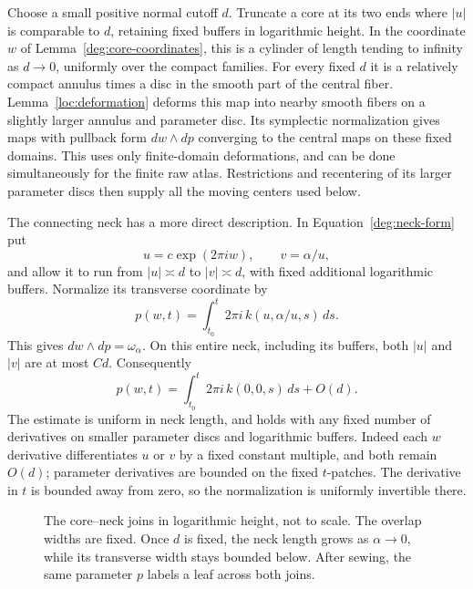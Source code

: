 Choose a small positive normal cutoff $d$.  Truncate a core at
its two ends where $|u|$ is comparable to $d$, retaining fixed
buffers in logarithmic height.  In the coordinate $w$ of
Lemma~\ref{deg:core-coordinates}, this is a cylinder of length
tending to infinity as $d\to0$, uniformly over the compact
families.  For every fixed $d$ it is a relatively compact annulus
times a disc in the smooth part of the central fiber.
Lemma~\ref{loc:deformation} deforms this map into nearby smooth
fibers on a slightly larger annulus and parameter disc.  Its
symplectic normalization gives maps with pullback form
$dw\wedge dp$ converging to the central maps on these fixed
domains.  This uses only finite-domain deformations, and can be
done simultaneously for the finite raw atlas.  Restrictions and
recentering of its larger parameter discs then supply all the
moving centers used below.

The connecting neck has a more direct description.  In
Equation~\eqref{deg:neck-form} put
\[
 u=c\exp(2\pi i w),\qquad v=\alpha/u,
\]
and allow it to run from $|u|\asymp d$ to $|v|\asymp d$,
with fixed additional logarithmic buffers.  Normalize its
transverse coordinate by
\begin{equation}\label{deg:neck-normalization}
 p(w,t)=\int_{t_0}^t2\pi i\,k(u,\alpha/u,s)\,ds.
\end{equation}
This gives $dw\wedge dp=\omega_\alpha$.  On this entire neck,
including its buffers, both $|u|$ and $|v|$ are at most $Cd$.
Consequently
\[
 p(w,t)=\int_{t_0}^t2\pi i\,k(0,0,s)\,ds+O(d).
\]
The estimate is uniform in neck length, and holds with any fixed
number of derivatives on smaller parameter discs and logarithmic
buffers.  Indeed each $w$ derivative differentiates $u$ or $v$
by a fixed constant multiple, and both remain $O(d)$; parameter
derivatives are bounded on the fixed $t$-patches.  The derivative
in $t$ is bounded away from zero, so the normalization is
uniformly invertible there.

\begin{figure}[ht]
\centering
{}
\caption{The core--neck joins in logarithmic height, not to scale.
The overlap widths are fixed.  Once $d$ is fixed, the neck length
grows as $\alpha\to0$, while its transverse width stays bounded
below.  After sewing, the same parameter $p$ labels a leaf across
both joins.}
\label{deg:neck-figure}
\end{figure}

